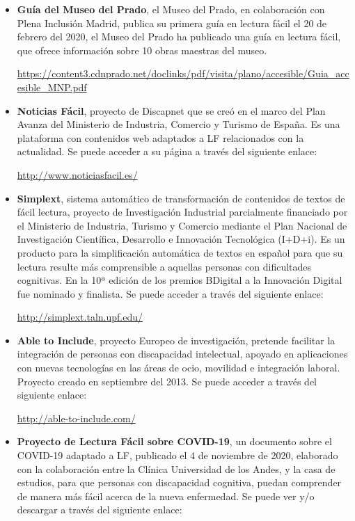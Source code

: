 \begin{itemize}
\item
{\textbf{Guía del Museo del Prado}}, el Museo del Prado, en colaboración con Plena Inclusión Madrid, publica su primera guía en lectura fácil el 20 de febrero del 2020, el Museo del Prado ha publicado una guía en lectura fácil, que ofrece información sobre 10 obras maestras del museo.

\href{https://content3.cdnprado.net/doclinks/pdf/visita/plano/accesible/Guia\_accesible\_MNP.pdf}{https://content3.cdnprado.net/doclinks/pdf/visita/plano/accesible/Guia\_accesible\_MNP.pdf}


\item
{\textbf{Noticias Fácil}}, proyecto de Discapnet que se creó en el marco del Plan Avanza del Ministerio de Industria, Comercio y Turismo de España. Es una plataforma con contenidos web adaptados a LF relacionados con la actualidad. Se puede acceder a su página a través del siguiente enlace:

\href{http://www.noticiasfacil.es/}{http://www.noticiasfacil.es/}

\item
{\textbf{Simplext}}, sistema automático de transformación de contenidos de textos de fácil lectura, proyecto de Investigación Industrial parcialmente financiado por el Ministerio de Industria, Turismo y Comercio mediante el Plan Nacional de Investigación Científica, Desarrollo e Innovación Tecnológica (I+D+i). Es un producto para la simplificación automática de textos en español para que su lectura resulte más comprensible a aquellas personas con dificultades cognitivas. En la 10ª edición de los premios BDigital a la Innovación Digital fue nominado y finalista. Se puede acceder a través del siguiente enlace:
 
\href{http://simplext.taln.upf.edu/}{http://simplext.taln.upf.edu/}

\item
{\textbf{Able to Include}}, proyecto Europeo de investigación, pretende facilitar la integración de personas con discapacidad intelectual, apoyado en aplicaciones con nuevas tecnologías en las áreas de ocio, movilidad e integración laboral. Proyecto creado en septiembre del 2013.
Se puede acceder a través del siguiente enlace:

\href{http://able-to-include.com/}{http://able-to-include.com/}

\item
{\textbf{Proyecto de Lectura Fácil sobre COVID-19}}, un documento sobre el COVID-19 adaptado a LF, publicado el 4 de noviembre de 2020, elaborado con la colaboración entre la Clínica Universidad de los Andes, y la casa de estudios, para que personas con discapacidad cognitiva, puedan comprender de manera más fácil acerca de la nueva enfermedad.
Se puede ver y/o descargar a través del siguiente enlace:


\end{itemize}
